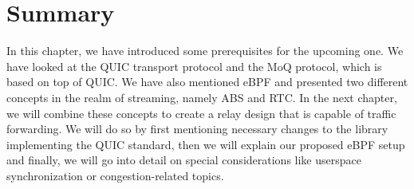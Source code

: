 \section{Summary}\label{sec:summary_ch2}

In this chapter, we have introduced some prerequisites for the 
upcoming one.
We have looked at the QUIC transport protocol and the MoQ protocol, which is 
based on top of QUIC\@.
We have also mentioned eBPF and presented two different concepts in the 
realm of streaming, namely ABS and RTC\@.
In the next chapter, we will combine these concepts to create a 
relay design that is capable of traffic forwarding.
We will do so by first mentioning necessary changes to the library 
implementing the QUIC standard, then we will explain our proposed eBPF setup 
and finally, we will go into detail on special considerations like 
userspace synchronization or congestion-related topics.